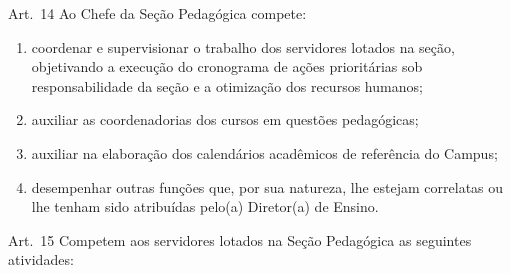 \documentclass[a4paper,12pt]{report}
\begin{document}
Art.~14 Ao Chefe da Seção Pedagógica compete:

\begin{enumerate}
\renewcommand{\labelenumi}{\Roman{enumi}}

\item coordenar e supervisionar o trabalho dos servidores lotados na seção, objetivando a 
      execução do cronograma de ações prioritárias sob responsabilidade da seção e a otimização dos recursos humanos;

\item auxiliar as coordenadorias dos cursos em questões pedagógicas;

\item auxiliar na elaboração dos calendários acadêmicos de referência do Campus;

\item desempenhar outras funções que, por sua natureza, lhe estejam correlatas ou lhe 
      tenham sido atribuídas pelo(a) Diretor(a) de Ensino.
\end{enumerate}


Art.~15 Competem aos servidores lotados na Seção Pedagógica as seguintes atividades:
\end{document}
